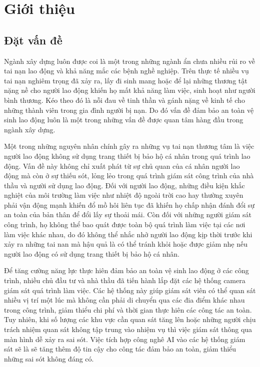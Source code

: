 \chapter{Giới thiệu}

\section{Đặt vấn đề}
Ngành xây dựng luôn được coi là một trong những ngành ẩn chưa nhiều rủi ro về tai nạn lao động 
và khả năng mắc các bệnh nghề nghiệp. Trên thực tế nhiều vụ tai nạn nghiêm trọng đã xảy ra, lấy đi 
sinh mang hoặc để lại những thương tật nặng nề cho người lao động khiến họ mất khả năng làm việc, 
sinh hoạt như người bình thương. Kéo theo đó là nỗi đau về tinh thần và gánh nặng về kinh tế 
cho những thành viên trong gia đình người bị nạn. Do đó vấn đề đảm bảo an toàn vệ sinh lao động 
luôn là một trong những vấn đề được quan tâm hàng đầu trong ngành xây dựng.

Một trong những nguyên nhân chính gây ra những vụ tai nạn thương tâm là việc người lao động không sử 
dụng trang thiết bị bảo hộ cá nhân trong quá trình lao động. Vấn đề này không chỉ xuất phát từ sự chủ 
quan của cá nhân người lao động mà còn ở sự thiếu sót, lỏng lẻo trong quá trình giám sát công trình của 
nhà thầu và người sử dụng lao động. Đối với người lao động, những điều kiện khắc nghiệt của môi trường 
làm việc như nhiệt độ ngoài trời cao hay thường xuyên phải vận động mạnh khiến đổ mồ hôi liên tục đã khiến họ chấp nhận đánh đổi sự an toàn của bản thân để đổi lấy sự thoải mái. Còn đối với những người giám sát công trình, họ không thể bao quát được toàn bộ quá trình làm việc tại các nơi làm việc khác 
nhau, do đó không thể nhắc nhở người lao động kịp thời trước khi xảy ra những tai nan mà hậu quả là có thể tránh khỏi hoặc được giảm nhẹ nếu người lao động có sử dụng trang thiết bị bảo hộ cá nhân.

Để tăng cường năng lực thực hiên đảm bảo an toàn vệ sinh lao động ở các công trình, nhiều chủ đầu tư và nhà thầu đã tiến hành lắp đặt các hệ thống camera giám sát quá trình làm việc. Các hệ thống này giúp giám sát viên có thể quan sát nhiều vị trí một lúc mà không cần phải di chuyển qua các đia điểm khác nhau trong công trình, giảm thiểu chi phí và thời gian thực hiên các công tác an toàn. Tuy nhiên, khi số lượng các khu vực cần quan sát tăng lên hoặc những người chịu trách nhiệm quan sát không tập trung vào nhiệm vụ  thì việc giám sát thông qua màn hình dễ xảy ra sai sót. Việc tích hợp công nghê AI vào các hệ thống giám sát sẽ là sẽ tăng thêm độ tin cậy cho công tác đảm bảo an toàn, giảm thiểu những sai sót không đáng có.

